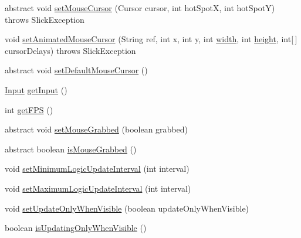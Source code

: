 \begin{DoxyCompactItemize}
\item 
abstract void \mbox{\hyperlink{classorg_1_1newdawn_1_1slick_1_1_game_container_a1a61ebf50939e4ec362426ee041b5d8a}{set\+Mouse\+Cursor}} (Cursor cursor, int hot\+SpotX, int hot\+SpotY)  throws Slick\+Exception
\item 
void \mbox{\hyperlink{classorg_1_1newdawn_1_1slick_1_1_game_container_a03f4fc9e7bf9d2d8ad048b95762a36d4}{set\+Animated\+Mouse\+Cursor}} (String ref, int x, int y, int \mbox{\hyperlink{classorg_1_1newdawn_1_1slick_1_1_game_container_a8c65160202b9f5aafde3fcf03e6155c9}{width}}, int \mbox{\hyperlink{classorg_1_1newdawn_1_1slick_1_1_game_container_aac7312a21bbcaabec14be965c683d970}{height}}, int\mbox{[}$\,$\mbox{]} cursor\+Delays)  throws Slick\+Exception 	
\item 
abstract void \mbox{\hyperlink{classorg_1_1newdawn_1_1slick_1_1_game_container_aafbac3cb7c8bb30af0bcafa4b86e33a0}{set\+Default\+Mouse\+Cursor}} ()
\item 
\mbox{\hyperlink{classorg_1_1newdawn_1_1slick_1_1_input}{Input}} \mbox{\hyperlink{classorg_1_1newdawn_1_1slick_1_1_game_container_a6042fd06c54872f9f791bd33beffec88}{get\+Input}} ()
\item 
int \mbox{\hyperlink{classorg_1_1newdawn_1_1slick_1_1_game_container_a58fc28d337ceef4846542a0b93ea24ec}{get\+F\+PS}} ()
\item 
abstract void \mbox{\hyperlink{classorg_1_1newdawn_1_1slick_1_1_game_container_aaefa09c4a1a2d83a1e2e44a9c6972030}{set\+Mouse\+Grabbed}} (boolean grabbed)
\item 
abstract boolean \mbox{\hyperlink{classorg_1_1newdawn_1_1slick_1_1_game_container_ad560cb00f8b4695169ec71ff73571c41}{is\+Mouse\+Grabbed}} ()
\item 
void \mbox{\hyperlink{classorg_1_1newdawn_1_1slick_1_1_game_container_ab502c60592e629c98f26fb3136a66575}{set\+Minimum\+Logic\+Update\+Interval}} (int interval)
\item 
void \mbox{\hyperlink{classorg_1_1newdawn_1_1slick_1_1_game_container_a256a6239d95ad2bc266cfc8be0750099}{set\+Maximum\+Logic\+Update\+Interval}} (int interval)
\item 
void \mbox{\hyperlink{classorg_1_1newdawn_1_1slick_1_1_game_container_a9e04385f8de0ccfad5ed732e7ae11f4f}{set\+Update\+Only\+When\+Visible}} (boolean update\+Only\+When\+Visible)
\item 
boolean \mbox{\hyperlink{classorg_1_1newdawn_1_1slick_1_1_game_container_af38f108ac8b1ea17f4e75828b9777007}{is\+Updating\+Only\+When\+Visible}} ()
\item 

\end{DoxyCompactItemize}
